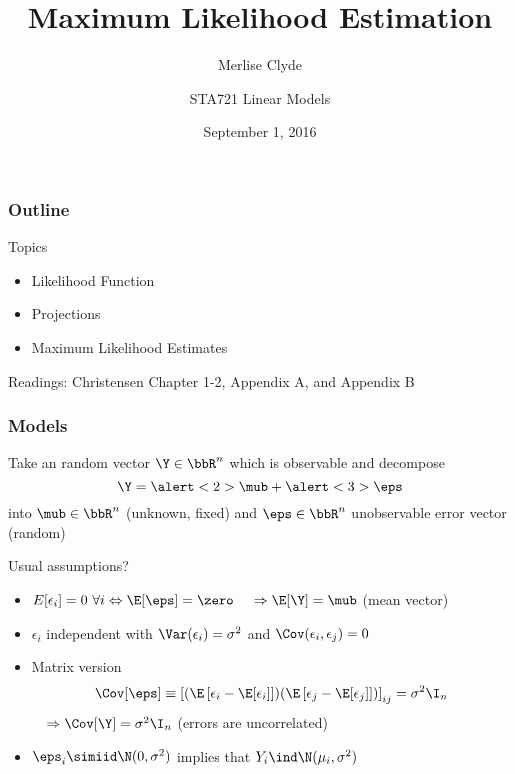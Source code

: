 \documentclass[handout]{beamer}
\title{Maximum Likelihood Estimation}
\subtitle{Merlise Clyde}
\author{STA721 Linear Models}
\institute{Duke University}
\date{September 1, 2016}
\begin{document}
\maketitle
\begin{frame}\frametitle{Outline}
Topics
  \begin{itemize}
 \item Likelihood Function
  \item Projections
  \item Maximum Likelihood Estimates


  \end{itemize}


Readings: Christensen Chapter 1-2, Appendix A, and Appendix B
\end{frame}


\begin{frame}
  \frametitle{Models}
Take an random vector $\Y \in \bbR^n$ which is observable and decompose  \pause
$$ \Y = \alert<2>{\mub} + \alert<3>{\eps}$$
into  \alert<2>{$\mub \in \bbR^n$ (unknown, fixed)} \pause and
\alert<3>{$\eps \in \bbR^n$ unobservable error vector (random)}
\pause

\vspace{18pt}
Usual assumptions? \pause
\begin{itemize}
\item $E[\epsilon_i] = 0 \ \forall i \Leftrightarrow \E[\eps] = \zero$ \pause  $ \quad \Rightarrow \E[\Y] = \mub$
  (mean vector) \pause
\item $\epsilon_i$ independent with $\Var(\epsilon_i) = \sigma^2$ and
  $\Cov(\epsilon_i, \epsilon_j) = 0$  
\item Matrix version $$\Cov[\eps] \equiv \left[ (\E\left[\epsilon_i -
  \E[\epsilon_i]\right])(\E\left[\epsilon_j - \E[\epsilon_j]\right])\right]_{ij} = \sigma^2 \I_n$$   \pause  $ \quad \Rightarrow
  \Cov[\Y] = \sigma^2 \I_n$  (errors are uncorrelated) \pause
\item $\eps_i \simiid \N(0, \sigma^2)$  implies that $Y_i \ind \N(\mu_i, \sigma^2)$
\end{itemize}

\end{frame}
\end{document}
